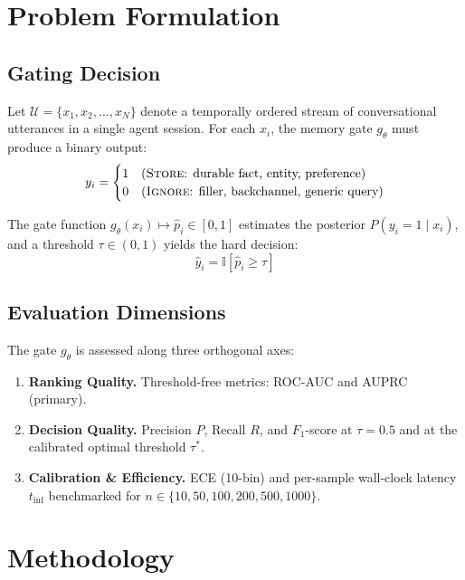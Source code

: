 \documentclass[conference]{IEEEtran}
\begin{document}
\section{Problem Formulation}

\subsection{Gating Decision}
Let $\mathcal{U} = \{x_1, x_2, \ldots, x_N\}$ denote a
temporally ordered stream of conversational utterances in
a single agent session.
For each $x_i$, the memory gate $g_\theta$ must produce a
binary output:
\begin{equation}
  y_i =
  \begin{cases}
    1 & \text{(\textsc{Store}: durable fact, entity, preference)} \\
    0 & \text{(\textsc{Ignore}: filler, backchannel, generic query)}
  \end{cases}
\end{equation}

The gate function $g_\theta(x_i) \mapsto \hat{p}_i \in [0,1]$
estimates the posterior $P(y_i{=}1 \mid x_i)$, and a
threshold $\tau \in (0,1)$ yields the hard decision:
\begin{equation}
  \hat{y}_i = \mathbb{I}[\hat{p}_i \geq \tau]
\end{equation}

\subsection{Evaluation Dimensions}
The gate $g_\theta$ is assessed along three orthogonal axes:
\begin{enumerate}
  \item \textbf{Ranking Quality.}
    Threshold-free metrics: ROC-AUC and AUPRC (primary).
  \item \textbf{Decision Quality.}
    Precision $P$, Recall $R$, and $F_1$-score at $\tau{=}0.5$
    and at the calibrated optimal threshold $\tau^*$.
  \item \textbf{Calibration \& Efficiency.}
    ECE (10-bin) and per-sample wall-clock latency $t_{\inf}$
    benchmarked for $n \in \{10, 50, 100, 200, 500, 1000\}$.
\end{enumerate}

\section{Methodology}
\end{document}
